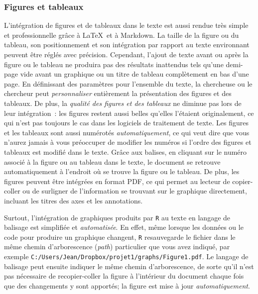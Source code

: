 \documentclass[
  letterpaper,
]{scrbook}
\begin{document}
\hypertarget{figures-et-tableaux}{%
\subsubsection{Figures et tableaux}\label{figures-et-tableaux}}

L'intégration de figures et de tableaux dans le texte est aussi rendue
très simple et professionnelle grâce à \LaTeX~et à Markdown. La taille
de la figure ou du tableau, son positionnement et son intégration par
rapport au texte environnant peuvent être réglés avec précision.
Cependant, l'ajout de texte avant ou après la figure ou le tableau ne
produira pas des résultats inattendus tels qu'une demi-page vide avant
un graphique ou un titre de tableau complètement en bas d'une page. En
définissant des paramètres pour l'ensemble du texte, la chercheuse ou le
chercheur peut \emph{personnaliser} entièrement la présentation des
figures et des tableaux. De plus, la \emph{qualité des figures et des
tableaux} ne diminue pas lors de leur intégration~: les figures restent
aussi belles qu'elles l'étaient originalement, ce qui n'est pas toujours
le cas dans les logiciels de traitement de texte. Les figures et les
tableaux sont aussi numérotés \emph{automatiquement}, ce qui veut dire
que vous n'aurez jamais à vous préoccuper de modifier les numéros si
l'ordre des figures et tableaux est modifié dans le texte. Grâce aux
balises, en cliquant sur le numéro associé à la figure ou au tableau
dans le texte, le document se retrouve automatiquement à l'endroit où se
trouve la figure ou le tableau. De plus, les figures peuvent être
intégrées en format PDF, ce qui permet au lecteur de copier-coller ou de
surligner de l'information se trouvant sur le graphique directement,
incluant les titres des axes et les annotations.

Surtout, l'intégration de graphiques produits par \texttt{R} au texte en
langage de balisage est simplifiée et \emph{automatisée}. En effet, même
lorsque les données ou le code pour produire un graphique changent,
\texttt{R} resauvegarde le fichier dans le même chemin d'arborescence
(\emph{path}) particulier que vous avez indiqué, par exemple
\texttt{C:/Users/Jean/Dropbox/projet1/graphs/Figure1.pdf}. Le langage de
balisage peut ensuite indiquer le même chemin d'arborescence, de sorte
qu'il n'est pas nécessaire de recopier-coller la figure à l'intérieur du
document chaque fois que des changements y sont apportés; la figure est
mise à jour \emph{automatiquement}.
\end{document}
